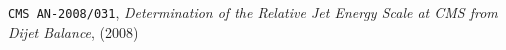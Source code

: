 \documentclass[a4paper]{cmspaper} %
\begin{document}










\begin{thebibliography}{9}
 \texttt{CMS AN-2008/031}, \textit{Determination of the Relative Jet Energy Scale at CMS from Dijet Balance}, (2008)
\end{thebibliography}
\end{document}
